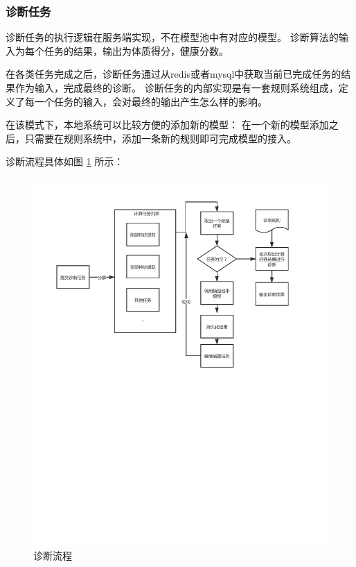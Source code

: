 \subsubsection{诊断任务}


诊断任务的执行逻辑在服务端实现，不在模型池中有对应的模型。 诊断算法的输入为每个任务的结果，输出为体质得分，健康分数。

在各类任务完成之后，诊断任务通过从redis或者mysql中获取当前已完成任务的结果作为输入，完成最终的诊断。 
诊断任务的内部实现是有一套规则系统组成，定义了每一个任务的输入，会对最终的输出产生怎么样的影响。

在该模式下，本地系统可以比较方便的添加新的模型： 在一个新的模型添加之后，只需要在规则系统中，添加一条新的规则即可完成模型的接入。

诊断流程具体如图 \ref{fig:sketch} 所示：

\begin{figure}[ht]
    \centering
    \includegraphics[width=12cm]{images/sketch.pdf}
    \caption{诊断流程}
    \label{fig:sketch}
\end{figure}

